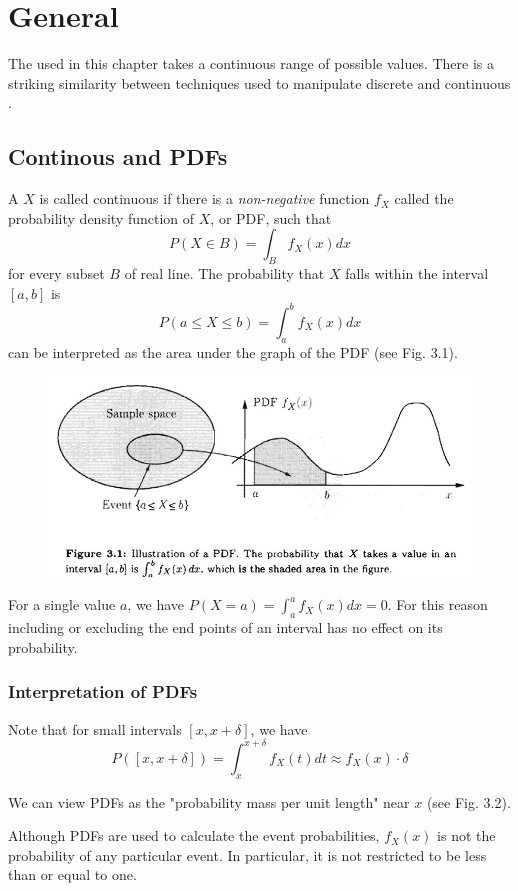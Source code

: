 \chapter{General \RV}
The \rv used in this chapter takes a continuous range of possible values. There is a striking similarity between techniques used to manipulate discrete and continuous \rv.

\section{Continous \rv and PDFs}
A \rv $X$ is called continuous if there is a \textit{non-negative} function $f_X$ called the probability density function of $X$, or PDF, such that
\[\boxed { P(X\in B) = \int_B f_X(x) dx }\]
for every subset $B$ of real line. The probability that $X$ falls within the interval $[a,b]$ is
\[P(a \le X \le b) = \int_a^b f_X(x) dx\]
can be interpreted as the area under the graph of the PDF (see Fig. 3.1).

\begin{figure}[h]
    \center
    \includegraphics[width=.8\textwidth]{images/P_pdf.jpeg}
 \end{figure}

 For a single value $a$, we have $P(X=a)=\int_a^a f_X(x) dx = 0$. For this reason including or excluding the end points of an interval has no effect on its probability.

 \subsection{Interpretation of PDFs}
 Note that for small intervals $[x,x+\delta]$, we have
 \[P([x,x+\delta]) = \int_x^{x+\delta} f_X(t)dt \approx f_X(x) \cdot \delta\]

 We can view PDFs as the "probability mass per unit length" near $x$ (see Fig. 3.2). 

 Although PDFs are used to calculate the event probabilities, $f_X(x)$ is not the probability of any particular event. In particular, it is not restricted to be less than or equal to one.

